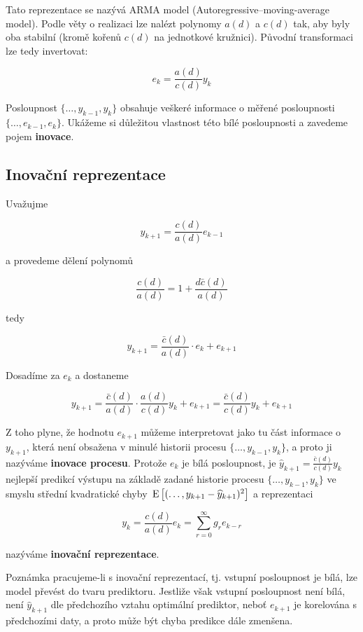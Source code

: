 Tato reprezentace se nazývá ARMA model (Autoregressive–moving-average model). Podle věty o realizaci lze nalézt polynomy $a(d)$ a $c(d)$ tak, aby byly oba stabilní (kromě kořenů $c(d)$ na jednotkové kružnici). Původní transformaci lze tedy invertovat:

\[ e_k=\frac{a(d)}{c(d)}y_k \]

Posloupnost $\{\ldots, y_{k-1}, y_k \}$ obsahuje veškeré informace o měřené posloupnosti $\{ \ldots, e_{k-1},e_k \}$. Ukážeme si důležitou vlastnost této bílé posloupnosti a zavedeme pojem \textbf{inovace}.

\subsection{Inovační reprezentace}
Uvažujme

\[ y_{k+1}=\frac{c(d)}{a(d)}e_{k-1} \]

a provedeme dělení polynomů

\[ \frac{c(d)}{a(d)} = 1+\frac{d\bar{c}(d)}{a(d)} \]

tedy

\[ y_{k+1} = \frac{\bar{c}(d)}{a(d)}\cdot e_k+e_{k+1} \]

Dosadíme za $e_k$ a dostaneme

\[ y_{k+1} = \frac{\bar{c}(d)}{a(d)}\cdot\frac{a(d)}{c(d)}y_k+e_{k+1}=\frac{\bar{c}(d)}{c(d)}y_k+e_{k+1} \]

Z toho plyne, že hodnotu $e_{k+1}$ můžeme interpretovat jako tu část informace o $y_{k+1}$, která není obsažena v minulé historii procesu $\{ \ldots,y_{k-1},y_k \}$, a proto ji nazýváme \textbf{inovace procesu}. Protože $e_k$ je bílá posloupnost, je $\widehat{y}_{k+1}=\frac{\bar{c}(d)}{c(d)}y_k$ nejlepší predikcí výstupu na základě zadané historie procesu $\{ \ldots, y_{k-1},y_k \}$ ve smyslu střední kvadratické chyby $\,\mathrm{E}\left[(\ldots, y_{k+1}-\widehat{y}_{k+1})^2\right]$ a reprezentaci

\[ y_k = \frac{c(d)}{a(d)}e_k = \sum_{r=0}^\infty g_r e_{k-r} \]

nazýváme \textbf{inovační reprezentace}.

\begin{note}{Poznámka}
pracujeme-li s inovační reprezentací, tj. vstupní posloupnost je bílá, lze model převést do tvaru prediktoru. Jestliže však vstupní posloupnost není bílá, není $\widehat{y}_{k+1}$ dle předchozího vztahu optimální prediktor, neboť $e_{k+1}$ je korelována s předchozími daty, a proto může být chyba predikce dále zmenšena.
\end{note}

